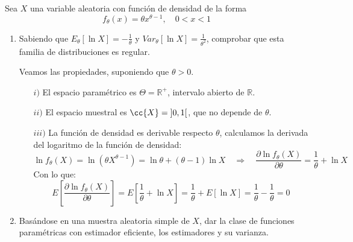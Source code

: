 \begin{ejercicio}\label{ej:10_rel4} %
    Sea $X$ una variable aleatoria con función de densidad de la forma
    \begin{equation*}
        f_\theta(x) = \theta x^{\theta-1}, \quad 0<x<1
    \end{equation*}
    \begin{enumerate}[label=\alph*)]
        \item Sabiendo que $E_\theta[\ln X] = -\frac{1}{\theta}$ y $Var_\theta[\ln X] = \frac{1}{\theta^2}$, comprobar que esta familia de distribuciones es regular.

            Veamos las propiedades, suponiendo que $\theta > 0$.
            \begin{enumerate}
                \item[$i)$] El espacio paramétrico es $\Theta = \mathbb{R}^+$, intervalo abierto de $\mathbb{R}$.
                \item[$ii)$] El espacio muestral es $\cc{X} = \left]0,1\right[$, que no depende de $\theta$.
                \item[$iii)$] La función de densidad es derivable respecto $\theta$, calculamos la derivada del logaritmo de la función de densidad:
                    \begin{equation*}
                        \ln f_\theta(X) = \ln(\theta X^{\theta-1}) = \ln\theta + (\theta-1)\ln X \quad \Longrightarrow \quad \dfrac{\partial \ln f_\theta(X)}{\partial \theta} = \frac{1}{\theta} + \ln X
                    \end{equation*}
                    Con lo que:
                    \begin{equation*}
                        E\left[\dfrac{\partial \ln f_\theta(X)}{\partial \theta}\right] = E\left[\frac{1}{\theta} + \ln X\right] = \frac{1}{\theta} + E[\ln X] = \frac{1}{\theta} - \frac{1}{\theta} = 0
                    \end{equation*}
            \end{enumerate}
        \item Basándose en una muestra aleatoria simple de $X$, dar la clase de funciones paramétricas con estimador eficiente, los estimadores y su varianza.


\end{enumerate}
\end{ejercicio}

